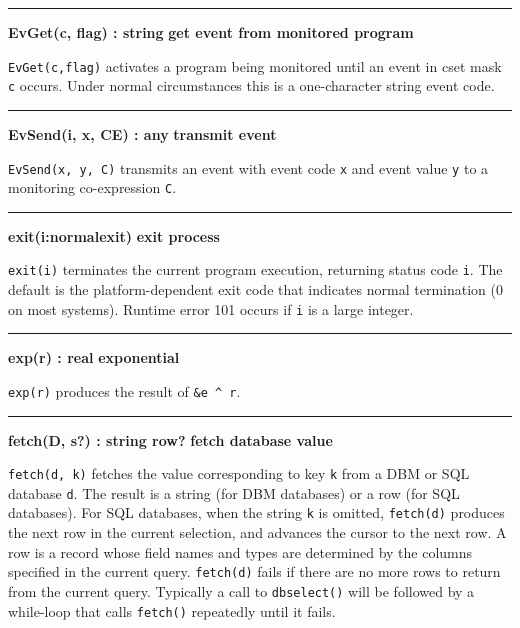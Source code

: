 \bigskip\hrule\vspace{0.1cm}
\noindent
{\bf EvGet(c, flag) : string } \hfill {\bf get event from monitored program}

\noindent
\texttt{EvGet(c,flag)} activates a program being monitored until an event
in cset mask \texttt{c} occurs. Under normal circumstances this is a
one-character string event code.

\bigskip\hrule\vspace{0.1cm}
\noindent
{\bf EvSend(i, x, CE) : any } \hfill {\bf transmit event}

\noindent
{}\texttt{EvSend(x, y, C)} transmits an event with event
code \texttt{x} and event value \texttt{y} to a monitoring
co-expression \texttt{C}.

\bigskip\hrule\vspace{0.1cm}
\noindent
{\bf exit(i:normalexit) } \hfill {\bf exit process}

\noindent
{}\texttt{exit(i)} terminates the current program execution,
returning status code \texttt{i}. The default is the platform-dependent exit
code that indicates normal termination (0 on most systems).
Runtime error 101 occurs if \texttt{i} is a large integer.

\bigskip\hrule\vspace{0.1cm}
\noindent
{\bf exp(r) : real } \hfill {\bf exponential}

\noindent
{}\texttt{exp(r)} produces the result of
\texttt{\&e \^{} r}.

\bigskip\hrule\vspace{0.1cm}
\noindent
{\bf fetch(D, s?) : string {\textbar} row? } \hfill {\bf fetch database value}

\noindent
{}\texttt{fetch(d, k)} fetches the value
corresponding to key \texttt{k} from a DBM or
SQL database \texttt{d}. The result is
a string (for DBM databases) or a row (for SQL databases). For SQL
databases, when the string \texttt{k} is omitted,
\texttt{fetch(d)} produces the next row \WarningNotThreadSafe
in the current selection, and advances the cursor to the next row. A
row is a record whose field names and types are determined by the
columns specified in the current query. \texttt{fetch(d)} fails if there are no
more rows to return from the current query. Typically a call to
\texttt{dbselect()} will be followed by a while{}-loop that calls
\texttt{fetch()} repeatedly until it fails.

